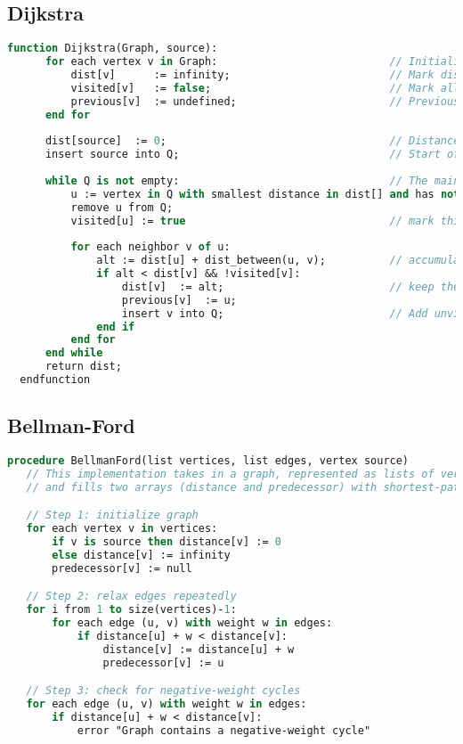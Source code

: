 \documentclass[10pt,a4paper]{article}
\begin{document}
\subsection*{Dijkstra}
\begin{lstlisting}[language=Pascal]
  function Dijkstra(Graph, source):
      for each vertex v in Graph:                           // Initializations
          dist[v]      := infinity;                         // Mark distances from source to v as not yet computed
          visited[v]   := false;                            // Mark all nodes as unvisited
          previous[v]  := undefined;                        // Previous node in optimal path from source
      end for
      
      dist[source]  := 0;                                   // Distance from source to itself is zero
      insert source into Q;                                 // Start off with the source node
                                                                
      while Q is not empty:                                 // The main loop
          u := vertex in Q with smallest distance in dist[] and has not been visited;  // Source node in first case
          remove u from Q;
          visited[u] := true                                // mark this node as visited
          
          for each neighbor v of u:   
              alt := dist[u] + dist_between(u, v);          // accumulate shortest dist from source
              if alt < dist[v] && !visited[v]:                                 
                  dist[v]  := alt;                          // keep the shortest dist from src to v
                  previous[v]  := u;
                  insert v into Q;                          // Add unvisited v into the Q to be processed
              end if
          end for
      end while
      return dist;
  endfunction
\end{lstlisting}

\subsection*{Bellman-Ford}
\begin{lstlisting}[language=Pascal]
procedure BellmanFord(list vertices, list edges, vertex source)
   // This implementation takes in a graph, represented as lists of vertices and edges,
   // and fills two arrays (distance and predecessor) with shortest-path information

   // Step 1: initialize graph
   for each vertex v in vertices:
       if v is source then distance[v] := 0
       else distance[v] := infinity
       predecessor[v] := null

   // Step 2: relax edges repeatedly
   for i from 1 to size(vertices)-1:
       for each edge (u, v) with weight w in edges:
           if distance[u] + w < distance[v]:
               distance[v] := distance[u] + w
               predecessor[v] := u

   // Step 3: check for negative-weight cycles
   for each edge (u, v) with weight w in edges:
       if distance[u] + w < distance[v]:
           error "Graph contains a negative-weight cycle"
\end{lstlisting}
\end{document}
